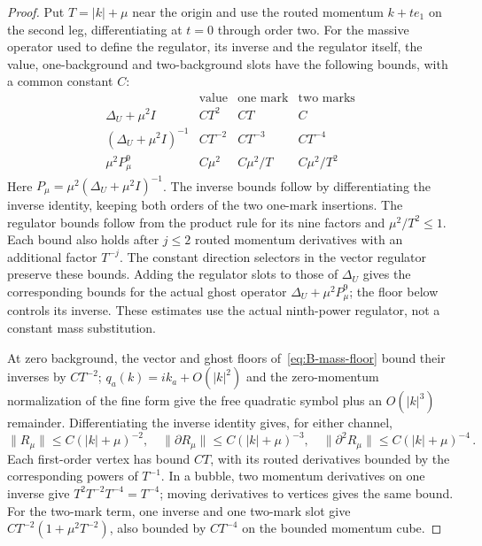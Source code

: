 \begin{proof}
Put $T=|k|+\mu$ near the origin and use the routed momentum $k+te_1$ on the second leg, differentiating at $t=0$ through order two. For the massive operator used to define the regulator, its inverse and the regulator itself, the value, one-background and two-background slots have the following bounds, with a common constant $C$:
\begin{equation*}
\begin{array}{l|ccc}
 &\text{value}&\text{one mark}&\text{two marks}\\\hline
\Delta_U+\mu^2I&CT^2&CT&C\\
(\Delta_U+\mu^2I)^{-1}&CT^{-2}&CT^{-3}&CT^{-4}\\
\mu^2P_\mu^9&C\mu^2&C\mu^2/T&C\mu^2/T^2
\end{array}
\end{equation*}
Here $P_\mu=\mu^2(\Delta_U+\mu^2I)^{-1}$. The inverse bounds follow by differentiating the inverse identity, keeping both orders of the two one-mark insertions. The regulator bounds follow from the product rule for its nine factors and $\mu^2/T^2\le1$. Each bound also holds after $j\le2$ routed momentum derivatives with an additional factor $T^{-j}$. The constant direction selectors in the vector regulator preserve these bounds. Adding the regulator slots to those of $\Delta_U$ gives the corresponding bounds for the actual ghost operator $\Delta_U+\mu^2P_\mu^9$; the floor below controls its inverse. These estimates use the actual ninth-power regulator, not a constant mass substitution.

At zero background, the vector and ghost floors of~\eqref{eq:B-mass-floor} bound their inverses by $CT^{-2}$; $q_a(k)=ik_a+O(|k|^2)$ and the zero-momentum normalization of the fine form give the free quadratic symbol plus an $O(|k|^3)$ remainder. Differentiating the inverse identity gives, for either channel,
\begin{equation*}
\|R_\mu\|\le C(|k|+\mu)^{-2},\quad
\|\partial R_\mu\|\le C(|k|+\mu)^{-3},\quad
\|\partial^2R_\mu\|\le C(|k|+\mu)^{-4}\,.
\end{equation*}
Each first-order vertex has bound $CT$, with its routed derivatives bounded by the corresponding powers of $T^{-1}$. In a bubble, two momentum derivatives on one inverse give $T^2T^{-2}T^{-4}=T^{-4}$; moving derivatives to vertices gives the same bound. For the two-mark term, one inverse and one two-mark slot give $CT^{-2}(1+\mu^2T^{-2})$, also bounded by $CT^{-4}$ on the bounded momentum cube.


\end{proof}
